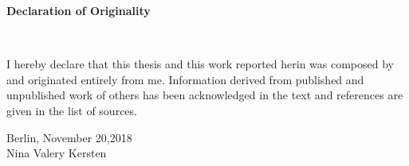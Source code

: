 \newpage
\thispagestyle{empty}

\begin{Large}\textbf{Declaration of Originality}\end{Large}\\

\begin{large}

\vspace*{2cm}

\noindent
I hereby declare that this thesis and this work reported herin was composed by and originated entirely from me. Information derived from published and unpublished work of others has been acknowledged in the text and references are given in the list of sources.

\vspace{2cm}

\noindent
Berlin, November 20,2018\\


Nina Valery Kersten

\end{large}
